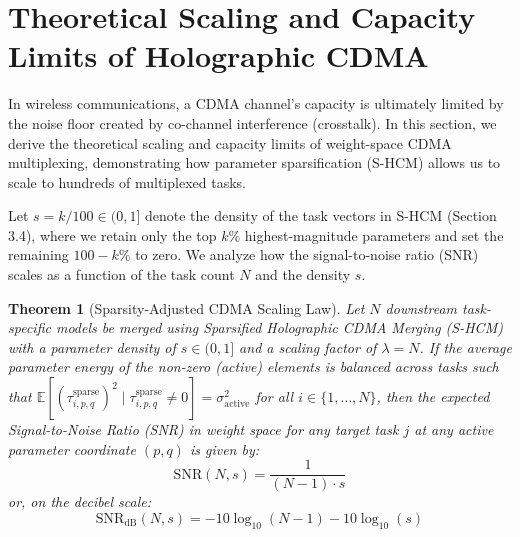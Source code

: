 \documentclass{article}
\newtheorem{theorem}{Theorem}
\begin{document}
\section{Theoretical Scaling and Capacity Limits of Holographic CDMA}
\label{sec:scaling_appendix}

In wireless communications, a CDMA channel's capacity is ultimately limited by the noise floor created by co-channel interference (crosstalk). In this section, we derive the theoretical scaling and capacity limits of weight-space CDMA multiplexing, demonstrating how parameter sparsification (S-HCM) allows us to scale to hundreds of multiplexed tasks.

Let $s = k/100 \in (0, 1]$ denote the density of the task vectors in S-HCM (Section 3.4), where we retain only the top $k\%$ highest-magnitude parameters and set the remaining $100-k\%$ to zero. 
We analyze how the signal-to-noise ratio (SNR) scales as a function of the task count $N$ and the density $s$.

\begin{theorem}[Sparsity-Adjusted CDMA Scaling Law]
Let $N$ downstream task-specific models be merged using Sparsified Holographic CDMA Merging (S-HCM) with a parameter density of $s \in (0, 1]$ and a scaling factor of $\lambda = N$. If the average parameter energy of the non-zero (active) elements is balanced across tasks such that $\mathbb{E}[(\tau^{\text{sparse}}_{i, p, q})^2 \mid \tau^{\text{sparse}}_{i, p, q} \neq 0] = \sigma^2_{\text{active}}$ for all $i \in \{1, \dots, N\}$, then the expected Signal-to-Noise Ratio (SNR) in weight space for any target task $j$ at any active parameter coordinate $(p, q)$ is given by:
\begin{equation}
    \text{SNR}(N, s) = \frac{1}{(N - 1) \cdot s}
\end{equation}
or, on the decibel scale:
\begin{equation}
    \text{SNR}_{\text{dB}}(N, s) = -10 \log_{10}(N - 1) - 10 \log_{10}(s)
\end{equation}
\end{theorem}
\end{document}
